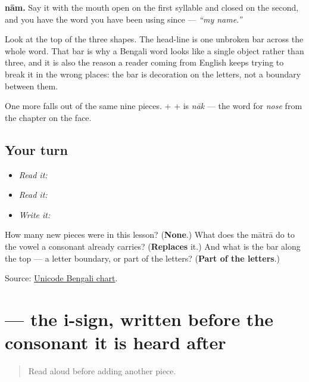 \textbf{nām.} Say it with the mouth open on the first syllable and closed on the second, and you have the word you have been using since \textbf{ } — \emph{\textquotedblleft{}my name.\textquotedblright{}}

Look at the top of the three shapes. The head-line is one unbroken bar across the whole word. That bar is why a Bengali word looks like a single object rather than three, and it is also the reason a reader coming from English keeps trying to break it in the wrong places: the bar is decoration on the letters, not a boundary between them.

One more falls out of the same nine pieces. \textbf{} + \textbf{} + \textbf{} is \emph{nāk} — the word for \emph{nose} from the chapter on the face.

\subsection*{Your turn}
\begin{itemize}
\raggedright
  \item \emph{Read it:} 
  \item \emph{Read it:} 
  \item \emph{Write it:} 
\end{itemize}

\begin{tcolorbox}[breakable,colback=teal!4,colframe=teal!35!black,title={Before you move on}]
How many new pieces were in this lesson? (\textbf{None}.) What does the mātrā do to the vowel a consonant already carries? (\textbf{Replaces} it.) And what is the bar along the top — a letter boundary, or part of the letters? (\textbf{Part of the letters}.)

Source: \href{https://www.unicode.org/charts/PDF/U0980.pdf}{Unicode Bengali chart}.
\end{tcolorbox}
\section[\texorpdfstring{\bn{ি} (-i)}{ি (-i)}]{ — the i-sign, written before the consonant it is heard after}

\label{lesson:BN-W02-i-matra}



\begin{quote}
Read \textbf{} aloud before adding another piece.
\end{quote}


